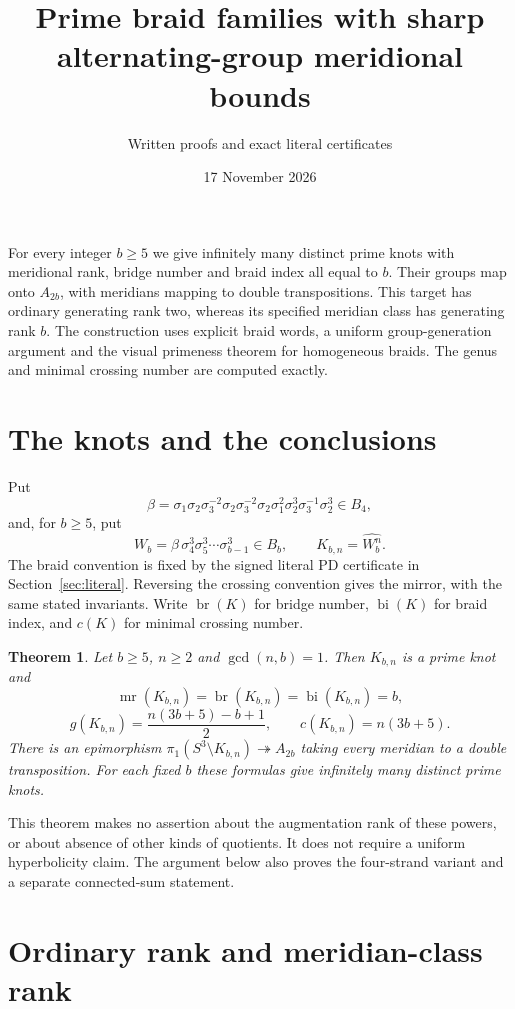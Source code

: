 \documentclass[11pt]{article}
\title{Prime braid families with sharp alternating-group meridional bounds}
\author{Written proofs and exact literal certificates}
\date{17 November 2026}
\newtheorem{theorem}{Theorem}
\newcommand{\mr}{\operatorname{mr}}
\newcommand{\br}{\operatorname{br}}
\newcommand{\bi}{\operatorname{bi}}
\begin{document}
\maketitle

For every integer $b\ge5$ we give infinitely many distinct prime knots
with meridional rank, bridge number and braid index all equal to $b$.
Their groups map onto $A_{2b}$, with meridians mapping to double
transpositions. This target has ordinary generating rank two, whereas
its specified meridian class has generating rank $b$. The construction
uses explicit braid words, a uniform group-generation argument and the
visual primeness theorem for homogeneous braids. The genus and minimal
crossing number are computed exactly.

\section{The knots and the conclusions}

Put
\begin{equation}\label{eq:beta}
 \beta=\sigma_1\sigma_2\sigma_3^{-2}\sigma_2\sigma_3^{-2}
        \sigma_2\sigma_1^2\sigma_2^3\sigma_3^{-1}\sigma_2^3\in B_4,
\end{equation}
and, for $b\ge5$, put
\[
 W_b=\beta\,\sigma_4^3\sigma_5^3\cdots\sigma_{b-1}^3\in B_b,
 \qquad K_{b,n}=\widehat{W_b^n}.
\]
The braid convention is fixed by the signed literal PD certificate in
Section~\ref{sec:literal}. Reversing the crossing convention gives the
mirror, with the same stated invariants. Write $\br(K)$ for bridge
number, $\bi(K)$ for braid index, and $c(K)$ for minimal crossing number.

\begin{theorem}\label{thm:family}
Let $b\ge5$, $n\ge2$ and $\gcd(n,b)=1$. Then $K_{b,n}$ is a prime knot and
\[
 \mr(K_{b,n})=\br(K_{b,n})=\bi(K_{b,n})=b,
\]
\[
 g(K_{b,n})=\frac{n(3b+5)-b+1}{2},\qquad
 c(K_{b,n})=n(3b+5).
\]
There is an epimorphism
$\pi_1(S^3\setminus K_{b,n})\twoheadrightarrow A_{2b}$ taking every
meridian to a double transposition. For each fixed $b$ these formulas
give infinitely many distinct prime knots.
\end{theorem}

This theorem makes no assertion about the augmentation rank of these
powers, or about absence of other kinds of quotients. It does not require
a uniform hyperbolicity claim. The argument below also proves the
four-strand variant and a separate connected-sum statement.

\section{Ordinary rank and meridian-class rank}
\end{document}

